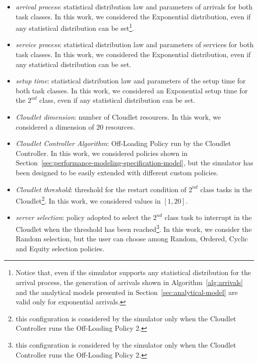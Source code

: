 \begin{itemize}
	\item \textit{arrival process}: statistical distribution law and parameters of arrivals for both task classes. In this work, we considered the Exponential distribution, even if any statistical distribution can be set\footnote{Notice that, even if the simulator supports any statistical distribution for the arrival process, the generation of arrivals shown in Algorithm~\ref{alg:arrivals} and the analytical models presented in Section~\ref{sec:analytical-model} are valid only for exponential arrivals.}.
	
	\item \textit{service process}: statistical distribution law and parameters of services for both task classes. In this work, we considered the Exponential distribution, even if any statistical distribution can be set.
	
	\item \textit{setup time}: statistical distribution law and parameters of the setup time for both task classes. In this work, we considered an Exponential setup time for the $2^{nd}$ class, even if any statistical distribution can be set.
	
	\item \textit{Cloudlet dimension}: number of Cloudlet resources. In this work, we considered a dimension of $20$ resources.
	
	\item \textit{Cloudlet Controller Algorithm}: Off-Loading Policy run by the Cloudlet Controller. In this work, we considered policies shown in Section~\ref{sec:performance-modeling-specification-model}, but the simulator has been designed to be easily extended with different custom policies.
		
	\item \textit{Cloudlet threshold}: threshold for the restart condition of $2^{nd}$ class tasks in the Cloudlet\footnote{this configuration is considered by the simulator only when the Cloudlet Controller runs the Off-Loading Policy 2.}. In this work, we considered values in $[1,20]$.
	
	\item \textit{server selection}: policy adopted to select the $2^{nd}$ class task to interrupt in the Cloudlet when the threshold has been reached\footnote{this configuration is considered by the simulator only when the Cloudlet Controller runs the Off-Loading Policy 2.}. In this work, we consider the Random selection, but the user can choose among Random, Ordered, Cyclic and Equity selection policies.
\end{itemize}

